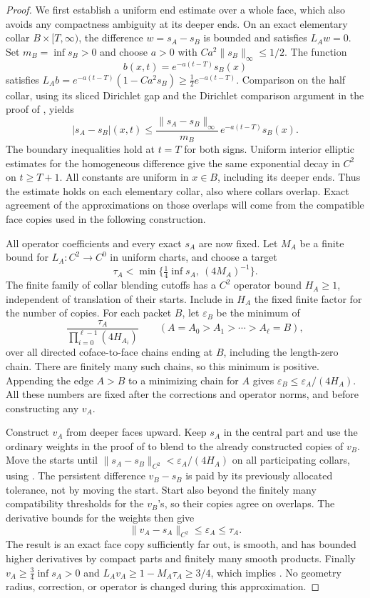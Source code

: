 \documentclass[11pt]{article}
\numberwithin{equation}{section}
\theoremstyle{definition}
\theoremstyle{remark}
\begin{document}
\begin{proof}
We first establish a uniform end estimate over a whole face, which
also avoids any compactness ambiguity at its deeper ends.  On an
exact elementary collar $B\times[T,\infty)$, the difference
$w=s_A-s_B$ is bounded and satisfies $L_Aw=0$.  Set
$m_B=\inf s_B>0$ and choose $a>0$ with
$Ca^2\|s_B\|_\infty\le1/2$.  The function
\[
 b(x,t)=e^{-a(t-T)}s_B(x)
\]
satisfies $L_Ab=e^{-a(t-T)}(1-Ca^2s_B)\ge\tfrac12e^{-a(t-T)}$.
Comparison on the half collar, using its sliced Dirichlet gap and
the Dirichlet comparison argument in the proof of
, yields
\begin{equation}\label{regular:end-decay}
 |s_A-s_B|(x,t)\le
 \frac{\|s_A-s_B\|_\infty}{m_B}\,
 e^{-a(t-T)}s_B(x).
\end{equation}
The boundary inequalities hold at $t=T$ for both signs.  Uniform
interior elliptic estimates for the homogeneous difference give the
same exponential decay in $C^2$ on $t\ge T+1$.  All constants are
uniform in $x\in B$, including its deeper ends.  Thus the estimate holds
on each elementary collar, also where collars overlap.  Exact agreement
of the approximations on those overlaps will come from the compatible
face copies used in the following construction.

All operator coefficients and every exact $s_A$ are now fixed.  Let
$M_A$ be a finite bound for $L_A:C^2\to C^0$ in uniform charts, and
choose a target
\[
 \tau_A<\min\{\tfrac14\inf s_A,\ (4M_A)^{-1}\}.
\]
The finite family of collar blending cutoffs has a $C^2$ operator
bound $H_A\ge1$, independent of translation of their starts.  Include in $H_A$ the fixed finite factor for the number of copies.
For each packet $B$, let $\varepsilon_B$ be the minimum of
\[
 \frac{\tau_A}{\prod_{i=0}^{\ell-1}(4H_{A_i})}
 \qquad
 (A=A_0>A_1>\cdots>A_\ell=B),
\]
over all directed coface-to-face chains ending at $B$, including the
length-zero chain. There are finitely many such chains, so this
minimum is positive. Appending the edge $A>B$ to a minimizing chain
for $A$ gives $\varepsilon_B\le\varepsilon_A/(4H_A)$.
All these numbers are fixed after the corrections and operator norms,
and before constructing any $v_A$.

Construct $v_A$ from deeper faces upward.  Keep $s_A$ in the central
part and use the ordinary weights in the proof of
 to blend to the already constructed copies
of $v_B$.  Move the starts until
$\|s_A-s_B\|_{C^2}<\varepsilon_A/(4H_A)$ on all participating
collars, using .  The persistent difference
$v_B-s_B$ is paid by its previously allocated tolerance, not by moving
the start.  Start also beyond the finitely many compatibility
thresholds for the $v_B$'s, so their copies agree on overlaps.
The derivative bounds for the weights then give
\[
 \|v_A-s_A\|_{C^2}\le\varepsilon_A\le\tau_A.
\]
The result is an exact face copy sufficiently far out, is smooth,
and has bounded higher derivatives by compact parts and finitely
many smooth products.  Finally $v_A\ge\tfrac34\inf s_A>0$ and
$L_Av_A\ge1-M_A\tau_A\ge3/4$, which implies
.  No geometry radius, correction,
or operator is changed during this approximation.
\end{proof}
\end{document}
